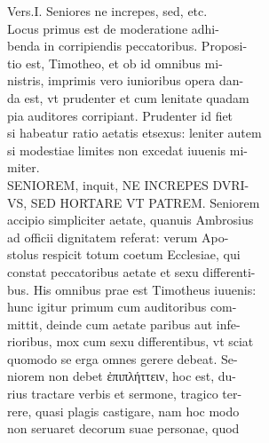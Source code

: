 \documentclass{article}
\begin{document}
\begin{pages}
                Vers.I. Seniores ne increpes, sed, etc. \\
                Locus primus est de moderatione adhi- \\
                benda in corripiendis peccatoribus. Proposi- \\
                tio est, Timotheo, et ob id omnibus mi- \\
                nistris, imprimis vero iunioribus opera dan- \\
                da est, vt prudenter et cum lenitate quadam \\
                pia auditores corripiant. Prudenter id fiet \\
                si habeatur ratio aetatis etsexus: leniter autem \\
                si modestiae limites non excedat iuuenis mi- \\
                miter. \\
                SENIOREM, inquit, NE INCREPES DVRI- \\
                VS, SED HORTARE VT PATREM. Seniorem \\
                accipio simpliciter aetate, quanuis Ambrosius \\
                ad officii dignitatem referat: verum Apo- \\
                stolus respicit totum coetum Ecclesiae, qui \\
                constat peccatoribus aetate et sexu differenti- \\
                bus. His omnibus prae est Timotheus iuuenis: \\
                hunc igitur primum cum auditoribus com- \\
                mittit, deinde cum aetate paribus aut infe- \\
                rioribus, mox cum sexu differentibus, vt sciat \\
                quomodo se erga omnes gerere debeat. Se- \\
                niorem non debet ἐπιπλήττειν, hoc est, du- \\
                rius tractare verbis et sermone, tragico ter- \\
                rere, quasi plagis castigare, nam hoc modo \\
                non seruaret decorum suae personae, quod \\

\end{pages}
\end{document}
